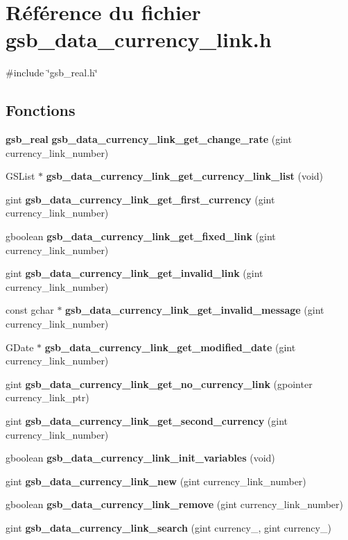 \section{Référence du fichier gsb\_\-data\_\-currency\_\-link.h}
\label{gsb__data__currency__link_8h}
{\ttfamily \#include \char`\"{}gsb\_\-real.h\char`\"{}}\par
\subsection*{Fonctions}
\begin{DoxyCompactItemize}
\item 
{\bf gsb\_\-real} {\bf gsb\_\-data\_\-currency\_\-link\_\-get\_\-change\_\-rate} (gint currency\_\-link\_\-number)
\item 
GSList $\ast$ {\bf gsb\_\-data\_\-currency\_\-link\_\-get\_\-currency\_\-link\_\-list} (void)
\item 
gint {\bf gsb\_\-data\_\-currency\_\-link\_\-get\_\-first\_\-currency} (gint currency\_\-link\_\-number)
\item 
gboolean {\bf gsb\_\-data\_\-currency\_\-link\_\-get\_\-fixed\_\-link} (gint currency\_\-link\_\-number)
\item 
gint {\bf gsb\_\-data\_\-currency\_\-link\_\-get\_\-invalid\_\-link} (gint currency\_\-link\_\-number)
\item 
const gchar $\ast$ {\bf gsb\_\-data\_\-currency\_\-link\_\-get\_\-invalid\_\-message} (gint currency\_\-link\_\-number)
\item 
GDate $\ast$ {\bf gsb\_\-data\_\-currency\_\-link\_\-get\_\-modified\_\-date} (gint currency\_\-link\_\-number)
\item 
gint {\bf gsb\_\-data\_\-currency\_\-link\_\-get\_\-no\_\-currency\_\-link} (gpointer currency\_\-link\_\-ptr)
\item 
gint {\bf gsb\_\-data\_\-currency\_\-link\_\-get\_\-second\_\-currency} (gint currency\_\-link\_\-number)
\item 
gboolean {\bf gsb\_\-data\_\-currency\_\-link\_\-init\_\-variables} (void)
\item 
gint {\bf gsb\_\-data\_\-currency\_\-link\_\-new} (gint currency\_\-link\_\-number)
\item 
gboolean {\bf gsb\_\-data\_\-currency\_\-link\_\-remove} (gint currency\_\-link\_\-number)
\item 
gint {\bf gsb\_\-data\_\-currency\_\-link\_\-search} (gint currency\_, gint currency\_)

\end{DoxyCompactItemize}
